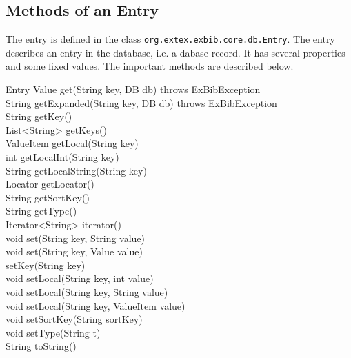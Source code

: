 \subsection{Methods of an Entry}\label{sec:groovy.entry}

The entry is defined in the class
\texttt{org.extex.exbib.core.db.Entry}. The entry describes an entry
in the database, i.e. a dabase record. It has several properties and
some fixed values.
The important methods are described below.

\begin{UMLclass}{Entry}
  Value get(String key, DB db) throws ExBibException\\
  String getExpanded(String key, DB db) throws ExBibException\\
  String getKey()\\
  List<String> getKeys()\\
  ValueItem getLocal(String key)\\
  int getLocalInt(String key)\\
  String getLocalString(String key)\\
  Locator getLocator()\\
  String getSortKey()\\
  String getType()\\
  Iterator<String> iterator()\\
  void set(String key, String value)\\
  void set(String key, Value value)\\
  setKey(String key)\\
  void setLocal(String key, int value)\\
  void setLocal(String key, String value)\\
  void setLocal(String key, ValueItem value)\\
  void setSortKey(String sortKey)\\
  void setType(String t)\\
  String toString()
\end{UMLclass}

